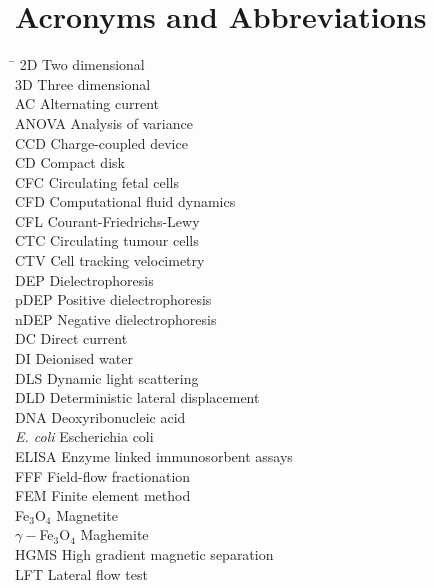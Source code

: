 \section*{Acronyms and Abbreviations}
\begin{tabbing}
 \hspace*{1.6cm}  \= \kill
 2D \>  Two dimensional \\[0.5ex]
 3D \>  Three dimensional \\[0.5ex] 
 AC \>  Alternating current \\[0.5ex]
 ANOVA \> Analysis of variance \\[0.5ex]
 CCD \> Charge-coupled device \\[0.5ex]
 CD \> Compact disk \\[0.5ex] 
 CFC \> Circulating fetal cells \\[0.5ex]
 CFD \> Computational fluid dynamics \\[0.5ex]
 CFL \> Courant-Friedrichs-Lewy \\[0.5ex]
 CTC \> Circulating tumour cells \\[0.5ex]
 CTV \> Cell tracking velocimetry \\[0.5ex]
 DEP \> Dielectrophoresis \\[0.5ex]
 pDEP \> Positive dielectrophoresis \\[0.5ex]
 nDEP \> Negative dielectrophoresis \\[0.5ex]
 DC \> Direct current \\[0.5ex]
 DI \> Deionised water \\[0.5ex]
 DLS \> Dynamic light scattering \\[0.5ex]
 DLD \> Deterministic lateral displacement \\[0.5ex]
 DNA \> Deoxyribonucleic acid \\[0.5ex]
 \textit{E. coli} \> Escherichia coli \\[0.5ex] 
 ELISA \> Enzyme linked immunosorbent assays  \\[0.5ex]
 FFF \> Field-flow fractionation  \\[0.5ex]
 FEM \> Finite element method \\[0.5ex]
 Fe$_{3}$O$_{4}$ \> Magnetite \\[0.5ex]
 $\gamma-$Fe$_{3}$O$_{4}$ \> Maghemite \\[0.5ex]
 HGMS \> High gradient magnetic separation \\[0.5ex]
 LFT \> Lateral flow test \\[0.5ex]

\end{tabbing}
